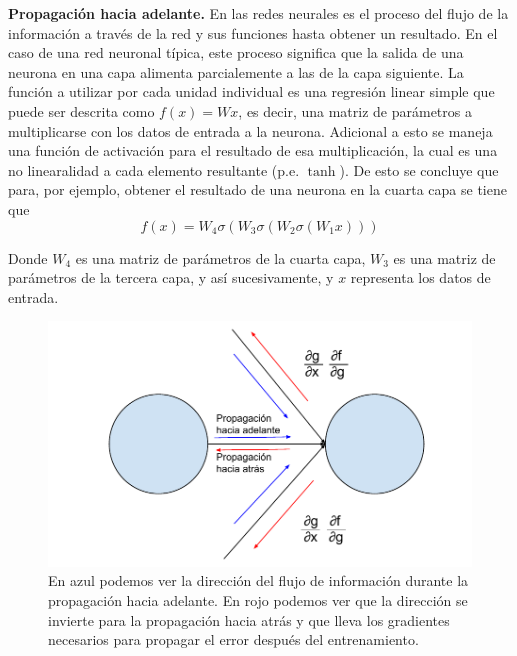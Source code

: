 \textbf{Propagación hacia adelante.} En las redes neurales es el proceso del flujo de la información a través de la red y sus funciones hasta obtener un resultado. En el caso de una red neuronal típica, este proceso significa que la salida de una neurona en una capa alimenta parcialemente a las de la capa siguiente. La función a utilizar por cada unidad individual es una regresión linear simple que puede ser descrita como $f(x) = W x$, es decir, una matriz de parámetros a multiplicarse con los datos de entrada a la neurona. Adicional a esto se maneja una función de activación para el resultado de esa multiplicación, la cual es una no linearalidad a cada elemento resultante (p.e. $\tanh$). De esto se concluye que para, por ejemplo, obtener el resultado de una neurona en la cuarta capa se tiene que
\begin{equation}
\label{eq:feedfwdeq}
f(x) = W_4 \sigma(W_3 \sigma (W_2 \sigma(W_1 x)))
\end{equation}

Donde $W_4$ es una matriz de parámetros de la cuarta capa, $W_3$ es una matriz de parámetros de la tercera capa, y así sucesivamente, y $x$ representa los datos de entrada.

\begin{figure}
\includegraphics[scale=0.8]{Figures/backprop.pdf}
\caption{En azul podemos ver la dirección del flujo de información durante la propagación hacia adelante. En rojo podemos ver que la dirección se invierte para la propagación hacia atrás y que lleva los gradientes necesarios para propagar el error después del entrenamiento.}
\label{fig:backprop}
\end{figure}


